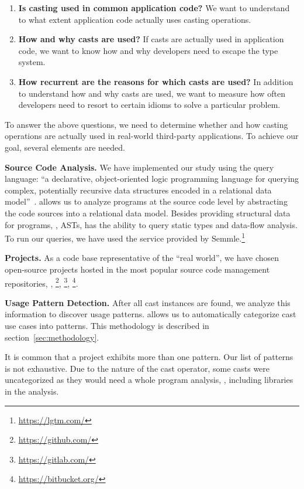 \begin{enumerate}[label=$RQ\arabic*:$,ref=$RQ\arabic*$,leftmargin=3.4\parindent]
\item\label{enum:rq1}{\bf Is casting used in common application code?}
We want to understand to what extent application code actually uses casting operations.
\item\label{enum:rq2}{\bf How and why casts are used?}
If casts are actually used in application code, we want to know how and why developers need to escape the type system.
\item\label{enum:rq3}{\bf How recurrent are the reasons for which casts are used?}
In addition to understand how and why casts are used, we want to measure how often developers need to resort to certain idioms to solve a particular problem.
\end{enumerate}

To answer the above questions, we need to determine whether and how casting operations are actually used in real-world third-party \java{} applications.
To achieve our goal, several elements are needed.

\textbf{Source Code Analysis.}
We have implemented our study using the \ql{} query language:
``a declarative, object-oriented logic programming language for querying complex, potentially recursive data structures encoded in a relational data model''~\cite{avgustinovQLObjectorientedQueries2016}.
\ql{} allows us to analyze programs at the source code level by abstracting the code sources into a relational data model.
Besides providing structural data for programs, \ie{}, ASTs, \ql{} has the ability to query static types and data-flow analysis.
To run our \ql{} queries, we have used the service provided by Semmle.\footnote{\url{https://lgtm.com/}} 

\textbf{Projects.} 
As a code base representative of the ``real world'', we have chosen open-source projects hosted in the most popular source code management repositories, \ie{}, \github{}\footnote{\url{https://github.com/}}, \gitlab{}\footnote{\url{https://gitlab.com/}}, \bitbucket{}\footnote{\url{https://bitbucket.org/}}.

\textbf{Usage Pattern Detection.}
After all cast instances are found, we analyze this information to discover usage patterns.
\ql{} allows us to automatically categorize cast use cases into patterns.
This methodology is described in section~\ref{sec:methodology}.

It is common that a project exhibits more than one pattern.
Our list of patterns is not exhaustive.
Due to the nature of the cast operator, some casts were uncategorized as they would need a whole program analysis, \eg{}, including libraries in the analysis.


